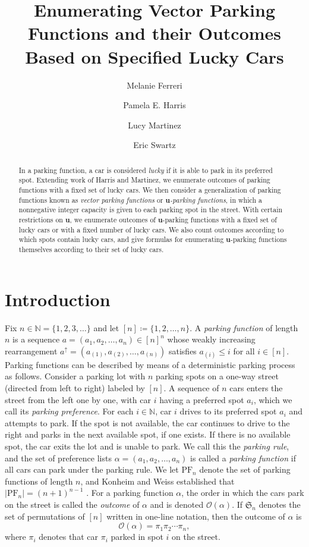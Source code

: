 \documentclass[reqno]{amsart}
\title{Enumerating Vector Parking Functions and their Outcomes Based on Specified Lucky Cars}
\author[Ferreri]{Melanie Ferreri}
\author[Harris]{Pamela E. Harris}
\author[Martinez]{Lucy Martinez}
\author[Swartz]{Eric Swartz}
\newcommand{\Sym}{\mathfrak{S}}
\newcommand{\PF}{\mathrm{PF}}
\theoremstyle{definition}
\theoremstyle{remark}
\newcommand{\NN}{\mathbb{N}}
\newcommand{\out}{\mathcal{O}}
\begin{document}
\begin{abstract}

In a parking function, a car is considered \emph{lucky} if it is able to park in its preferred spot. Extending work of Harris and Martinez, we enumerate outcomes of parking functions with a fixed set of lucky cars. We then consider a generalization of parking functions known as \emph{vector parking functions} or \emph{$\boldsymbol{u}$-parking functions}, in which a nonnegative integer capacity is given to each parking spot in the street. 
With certain restrictions on $\boldsymbol{u}$, we enumerate outcomes of $\boldsymbol{u}$-parking functions with a fixed set of lucky cars or with a fixed number of lucky cars. We also count outcomes according to which spots contain lucky cars, and give formulas for enumerating $\boldsymbol{u}$-parking functions themselves according to their set of lucky cars.

\end{abstract}

\maketitle




\section{Introduction}


Fix $n\in \NN=\{1,2,3,\ldots\}$ and let $[n]\coloneq\{1,2,\ldots,n\}$. 
A \emph{parking function} of length $n$ is a sequence $a=(a_1,a_2,\ldots, a_n)\in [n]^n$ whose weakly increasing rearrangement $a^\uparrow=(a_{(1)},a_{(2)},\ldots,a_{(n)})$ satisfies $a_{(i)}\leq i$ for all $i\in[n]$. Parking functions can be described by means of a deterministic parking process as follows. Consider a parking lot with $n$ parking spots on a one-way street (directed from left to right) labeled by $[n]$. A sequence of $n$ cars enters the street from the left one by one, with car $i$ having a preferred spot $a_i$, which we call its \emph{parking preference}. 
For each $i\in \NN$, car $i$ drives to its preferred spot $a_i$ and attempts to park. 
If the spot is not available, the car continues to drive to the right and parks in the next available spot, if one exists. 
If there is no available spot, the car exits the lot and is unable to park. 
We call this the \emph{parking rule}, and the set of preference lists $\alpha=(a_1,a_2,\ldots,a_n)$ is called a \emph{parking function} if all cars can park under the parking rule. 
We let $\PF_n$ denote the set of parking functions of length $n$, and Konheim and Weiss established that $|\PF_n|=(n+1)^{n-1}$ \cite{konheim1966occupancy}. 
For a parking function $\alpha$, the order in which the cars park on the street is called the \emph{outcome} of $\alpha$ and is denoted $\out(\alpha)$. If $\Sym_n$ denotes the set of permutations of $[n]$ written in one-line notation, then the outcome of $\alpha$ is 
\[\out(\alpha)=\pi_1\pi_2\cdots\pi_n,\]
where $\pi_i$ denotes that car $\pi_i$ parked in spot $i$ on the street.
\end{document}
